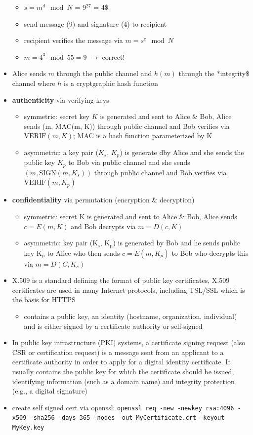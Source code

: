 \documentclass[11pt]{article}
\begin{document}
\begin{itemize}
\begin{itemize}
\item \(s= m^d \mod N\) = 9\(^{\text{27}}\)  = 4\$
\item send message (9) and signature (4) to recipient
\item recipient verifies the message via \(m = s^e \mod N\)
\item \(m = 4^3 \mod 55 = 9\) \(\rightarrow\) correct!
\end{itemize}
\item Alice sends \(m\) through the public channel and \(h(m)\) through the *integrity\$ channel where \(h\) is a cryptgraphic hash function
\item \textbf{authenticity} via verifying keys
\begin{itemize}
\item symmetric: secret key \(K\) is generated and sent to Alice \& Bob, Alice sends (m, MAC(m, K)) through public channel and Bob verifies via \(\text{VERIF}(m,K)\); MAC is a hash function parameterized by K
\item asymmetric: a key pair (\(K_s\), \(K_p\)) is generate dby Alice and she sends the public key \(K_p\) to Bob via public channel and she sends \((m, \text{SIGN}(m, K_s))\) through public channel and Bob verifies via \(\text{VERIF}(m, K_p)\)
\end{itemize}
\item \textbf{confidentiality} via permutation (encryption \& decryption)
\begin{itemize}
\item symmetric: secret K is generated and sent to Alice \& Bob, Alice sends \(c=E(m,K)\) and Bob decrypts via \(m=D(c,K)\)
\item asymmetric: key pair (K\(_{\text{s}}\), K\(_{\text{p}}\)) is generated by Bob and he sends public key K\(_{\text{p}}\) to Alice who then sends \(c=E(m,K_p)\) to Bob who decrypts this via \(m=D(C, K_s)\)
\end{itemize}
\item X.509 is a standard defining the format of public key certificates, X.509 certificates are used in many Internet protocols, including TSL/SSL which is the basis for HTTPS
\begin{itemize}
\item contains a public key, an identity (hostname, organization, individual) and is either signed by a certificate authority or self-signed
\end{itemize}
\item In public key infrastructure (PKI) systems, a certificate signing request (also CSR or certification request) is a message sent from an applicant to a certificate authority in order to apply for a digital identity certificate. It usually contains the public key for which the certificate should be issued, identifying information (such as a domain name) and integrity protection (e.g., a digital signature)
\item create self signed cert via openssl: \texttt{openssl req -new -newkey rsa:4096 -x509 -sha256 -days 365 -nodes -out MyCertificate.crt -keyout MyKey.key}
\end{itemize}
\end{document}
